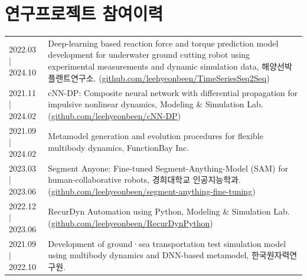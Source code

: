 \documentclass[a4paper,10pt]{extarticle}
\begin{document}
\section*{연구프로젝트 참여이력}
\noindent
{}
\vspace*{-.5cm}
\begin{longtable}{LR}
    {2022.03 | 2024.10} & Deep-learning based reaction force and torque prediction model development for underwater ground cutting robot using experimental measurements and dynamic simulation data, 해양선박플랜트연구소. (\href{https://github.com/leehyeonbeen/TimeSeriesSeq2Seq}{github.com/leehyeonbeen/TimeSeriesSeq2Seq}) \\
    {2021.11 | 2024.02} & cNN-DP: Composite neural network with differential propagation for impulsive nonlinear dynamics, Modeling \& Simulation Lab. (\href{https://github.com/leehyeonbeen/cNN-DP}{github.com/leehyeonbeen/cNN-DP})                                                                                  \\
    {2021.09 | 2024.02} & Metamodel generation and evolution procedures for flexible multibody dynamics, FunctionBay Inc.                                                                                                                                                                                               \\
    {2023.03 | 2023.06} & Segment Anyone: Fine-tuned Segment-Anything-Model (SAM) for human-collaborative robots, 경희대학교 인공지능학과. (\href{https://github.com/leehyeonbeen/segment-anything-fine-tuning}{github.com/leehyeonbeen/segment-anything-fine-tuning})                                                             \\
    {2022.12 | 2023.06} & RecurDyn Automation using Python, Modeling \& Simulation Lab. (\href{https://github.com/leehyeonbeen/RecurDynPython}{github.com/leehyeonbeen/RecurDynPython})                                                                                                                                 \\
    {2021.09 | 2022.10} & Development of ground·sea transportation test simulation model using multibody dynamics and DNN-based metamodel, 한국원자력연구원.                                                                                                                                                                    \\
\end{longtable}

% 

\end{document}
